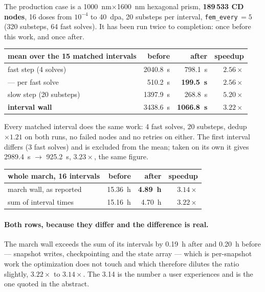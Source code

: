 \documentclass[11pt]{article}
\begin{document}
The production case is a \SI{1000}{\nano\meter}$\times$\SI{1600}{\nano\meter}
hexagonal prism, \textbf{189\,533 CD nodes}, 16 doses from
$10^{-4}$ to \SI{40}{dpa}, 20 substeps per interval,
\texttt{fem\_every}\,$=5$ (320 substeps, 64 fast solves). It has been run
twice to completion: once before this work, and once after.

\begin{center}
\begin{tabular}{lrrr}
\toprule
mean over the 15 matched intervals & before & after & speedup\\
\midrule
fast step (4 solves) & \SI{2040.8}{\second} & \SI{798.1}{\second} & $2.56\times$\\
\quad --- per fast solve & \SI{510.2}{\second} & \textbf{\SI{199.5}{\second}} & $\mathbf{2.56\times}$\\
slow step (20 substeps) & \SI{1397.9}{\second} & \SI{268.8}{\second} & $5.20\times$\\
\rowcolor{green!12}
\textbf{interval wall} & \SI{3438.6}{\second} & \textbf{\SI{1066.8}{\second}} & $\mathbf{3.22\times}$\\
\bottomrule
\end{tabular}
\end{center}

\noindent
Every matched interval does the same work: 4 fast solves, 20 substeps,
dedup $\times1.21$ on both runs, no failed nodes and no retries on either. The
first interval differs (3 fast solves) and is excluded from the mean; taken on
its own it gives \SI{2989.4}{\second} $\rightarrow$ \SI{925.2}{\second},
$3.23\times$, the same figure.

\begin{center}
\begin{tabular}{lrrr}
\toprule
whole march, 16 intervals & before & after & speedup\\
\midrule
\rowcolor{green!12}
march wall, as reported & \SI{15.36}{\hour} & \textbf{\SI{4.89}{\hour}} & $\mathbf{3.14\times}$\\
sum of interval times & \SI{15.16}{\hour} & \SI{4.70}{\hour} & $3.22\times$\\
\bottomrule
\end{tabular}
\end{center}

\paragraph{Both rows, because they differ and the difference is real.} The
march wall exceeds the sum of its intervals by \SI{0.19}{\hour} after and
\SI{0.20}{\hour} before --- snapshot writes, checkpointing and the state array
--- which is per-snapshot work the optimization does not touch and which
therefore dilutes the ratio slightly, $3.22\times$ to $3.14\times$. The
\SI{3.14}{} is the number a user experiences and is the one quoted in the
abstract.
\end{document}
